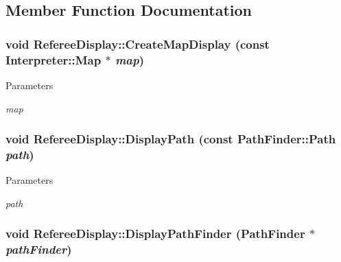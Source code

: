 \subsection{Member Function Documentation}
\hypertarget{classRefereeDisplay_a9c18f26c62f9507f903ec9b29c1bfea8}{
\subsubsection[{CreateMapDisplay}]{\setlength{\rightskip}{0pt plus 5cm}void RefereeDisplay::CreateMapDisplay (const {\bf Interpreter::Map} $\ast$ {\em map})}}
\label{classRefereeDisplay_a9c18f26c62f9507f903ec9b29c1bfea8}

\begin{DoxyParams}{Parameters}
\item[{\em map}]\end{DoxyParams}
\hypertarget{classRefereeDisplay_ad7f07077e92fd46956bf1aa25715e414}{
\subsubsection[{DisplayPath}]{\setlength{\rightskip}{0pt plus 5cm}void RefereeDisplay::DisplayPath (const {\bf PathFinder::Path} {\em path})}}
\label{classRefereeDisplay_ad7f07077e92fd46956bf1aa25715e414}

\begin{DoxyParams}{Parameters}
\item[{\em path}]\end{DoxyParams}
\hypertarget{classRefereeDisplay_a0ef334a53e0fde02da30460ed2fcbe06}{
\subsubsection[{DisplayPathFinder}]{\setlength{\rightskip}{0pt plus 5cm}void RefereeDisplay::DisplayPathFinder ({\bf PathFinder} $\ast$ {\em pathFinder})}}
\label{classRefereeDisplay_a0ef334a53e0fde02da30460ed2fcbe06}


